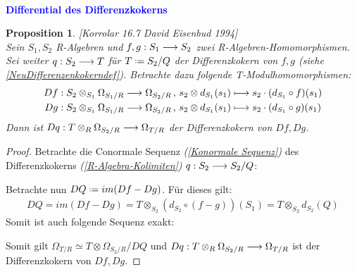 \documentclass[10pt,a4paper]{report}
\newcommand{\ModulsOfDifferenzials}{David Eisenbud 1994}
\newcounter{Aussage}[chapter]
\newtheorem{prop}[Aussage]{Proposition}
\newcommand{\functionfront}[3]{\nolinebreak{#1:#2 \longrightarrow #3}}
\newcommand{\function}[5]{\nolinebreak{#1:#2 \longrightarrow #3 \, , \, #4 \longmapsto #5}}
\newcommand{\divR}[2]{\Omega_{#1/#2}}
\newcommand{\divf}[1]{d_{#1}}
\newcommand{\Tensor}[3]{#1 \otimes_{#2} #3}
\newcommand{\tensor}[3]{#1 \otimes #3}
\newcommand*{\defeq}{\mathrel{\vcenter{\baselineskip0.5ex \lineskiplimit0pt
                     \hbox{\scriptsize.}\hbox{\scriptsize.}}}%
                     =}
\newcommand{\immage}[1]{im(#1)}
\begin{document}
\ \\
\textcolor{blue}{\textbf{Differential des Differenzkokerns}}
\begin{prop}\label{Differential des Differenzkokerns} \textit{[Korrolar 16.7 \ModulsOfDifferenzials]}\\
Sein $S_1,S_2$ R-Algebren und $\functionfront{f,g}{S_1}{S_2}$ zwei R-Algebren-Homomorphismen. Sei weiter $\functionfront{q}{S_2}{T}$ für $T \defeq S_2/Q$ der Differenzkokern von $f,g$ \textit{(siehe \cref{NeuDifferenzenkokerndef})}. Betrachte dazu folgende T-Modulhomomorphismen:
\begin{gather*}
\function{Df}{\Tensor{S_2}{S_1}{\divR{S_1}{R}}}{\divR{S_2}{R}}{\tensor{s_2}{S_1}{\divf{S_1}(s_1)}}{s_2 \cdot (\divf{S_1} \circ f)(s_1)} \\
\function{Dg}{\Tensor{S_2}{S_1}{\divR{S_1}{R}}}{\divR{S_2}{R}}{\tensor{s_2}{S_1}{\divf{S_1}(s_1)}}{s_2 \cdot (\divf{S_1} \circ g)(s_1)}
\end{gather*}
Dann ist $\functionfront{Dq}{\Tensor{T}{R}{\divR{S_2}{R}}}{\divR{T}{R}}$ der Differenzkokern von $Df,Dg$.
\end{prop}
\begin{proof}
Betrachte die Conormale Sequenz \textit{(\cref{Konormale Sequenz})} des Differenzkokerns \textit{(\cref{R-Algebra-Kolimiten})} $\functionfront{q}{S_2}{S_2/Q}$:
\begin{center}
\end{center}
Betrachte nun $DQ \defeq \immage{Df - Dg}$. Für dieses gilt:
\begin{gather*}
DQ = \immage{Df - Dg} = \Tensor{T}{S_2}{(\divf{S_2} \circ (f - g))(S_1)} = \Tensor{T}{S_2}{\divf{S_2}(Q)}
\end{gather*}
Somit ist auch folgende Sequenz exakt:
\begin{center}
\end{center}
Somit gilt $\divR{T}{R} \simeq \tensor{T}{S_2}{\divR{S_2}{R}} / DQ$ und $\functionfront{Dq}{\Tensor{T}{R}{\divR{S_2}{R}}}{\divR{T}{R}}$ ist der Differenzkokern von $Df,Dg$.
\end{proof}
\end{document}
